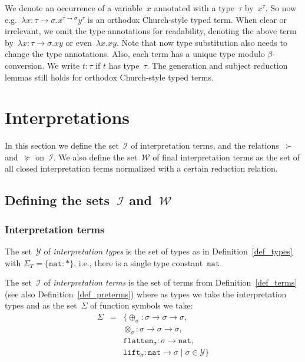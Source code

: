 \documentclass[runningheads,a4paper]{llncs}
\newcommand{\Iterms}{\mathcal{I}}
\newcommand{\World}{\mathcal{W}}
\newcommand{\ITypes}{\mathcal{Y}}
\newcommand{\arrtype}{\rightarrow}
\newcommand{\nat}{\mathtt{nat}}
\newcommand{\flatten}{\mathtt{flatten}}
\newcommand{\lift}{\mathtt{lift}}
\begin{document}
We denote an occurrence of a variable~$x$ annotated with a type~$\tau$
by~$x^\tau$. So now e.g.~$\lambda x : \tau\arrtype\sigma
. x^{\tau\arrtype\sigma}y^\tau$ is an orthodox Church-style typed
term. When clear or irrelevant, we omit the type annotations for
readability, denoting the above term by~$\lambda x :
\tau\arrtype\sigma . x y$ or even~$\lambda x . x y$. Note that now
type substitution also needs to change the type annotations. Also,
each term has a unique type modulo $\beta$-conversion. We write $t :
\tau$ if $t$ has type~$\tau$. The generation and subject reduction
lemmas still holds for orthodox Church-style typed terms.

\section{Interpretations}

In this section we define the set~$\Iterms$ of interpretation terms,
and the relations~$\succ$ and~$\succeq$ on~$\Iterms$. We also define
the set~$\World$ of final interpretation terms as the set of all closed
interpretation terms normalized with a certain reduction relation.

\subsection{Defining the sets~$\Iterms$ and~$\World$}\label{sec_world}

\subsubsection{Interpretation terms}

\begin{definition}\label{def_iterms}\normalfont
  The set~$\ITypes$ of \emph{interpretation types} is the set of types
  as in Definition~\ref{def_types} with $\Sigma_T = \{ \nat : * \}$,
  i.e., there is a single type constant~$\nat$.

  The set~$\Iterms$ of \emph{interpretation terms} is the set of terms
  from Definition~\ref{def_terms} (see also
  Definition~\ref{def_preterms}) where as types we take the
  interpretation types and as the set~$\Sigma$ of function symbols we
  take:
  \[
    \begin{array}{rcl}
      \Sigma &=& \{ \oplus_\sigma : \sigma \arrtype
                 \sigma \arrtype \sigma,\\ & & \otimes_\sigma : \sigma \arrtype \sigma
                 \arrtype \sigma,\\ & & \flatten_{\sigma} : \sigma \arrtype
                 \nat,\\ & & \lift_{\sigma} : \nat \arrtype \sigma \mid \sigma \in \ITypes
                 \}
    \end{array}
  \]
\end{definition}
\end{document}
